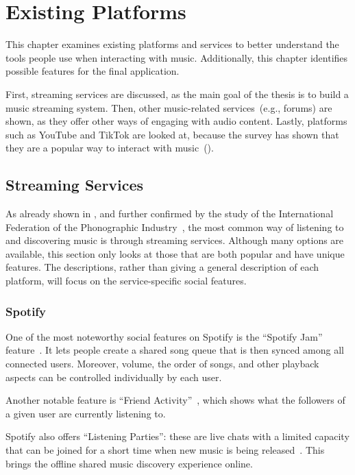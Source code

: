 \chapter{Existing Platforms}\label{ch:platforms}

This chapter examines existing platforms and services to better understand
the tools people use when interacting with music.
Additionally, this chapter identifies possible features for the final application.

First, streaming services are discussed, as the main goal of the thesis is to build
a music streaming system.
Then, other music-related services~(e.g., forums) are shown,
as they offer other ways of engaging with audio content.
Lastly, platforms such as YouTube and TikTok are looked at,
because the survey has shown that they are a popular way to interact with music~().


\section{Streaming Services}
As already shown in
,
and further confirmed by the study of the International Federation of
the Phonographic Industry~\parencite{music_stats_2024},
the most common way of listening to and discovering music is through streaming services.
Although many options are available, this section only looks at those that are both popular and
have unique features.
The descriptions, rather than giving a general description of each platform,
will focus on the service-specific social features.

\subsection{Spotify}
One of the most noteworthy social features on Spotify is the ``Spotify Jam'' feature~\parencite{spotify_jam}.
It lets people create a shared song queue that is then synced among all connected users.
Moreover, volume, the order of songs, and other playback aspects can be controlled individually by each user.

Another notable feature is ``Friend Activity''~\parencite{spotify_friend_activ},
which shows what the followers of a given user are currently listening to.

Spotify also offers ``Listening Parties'': these are live chats with a limited capacity
that can be joined for a short time when new music is being released~\parencite{spotify_party_1,spotify_party_2}.
This brings the offline shared music discovery experience online.

